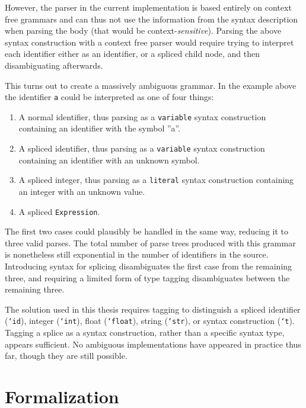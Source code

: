 \documentclass{kththesis}
\begin{document}
However, the parser in the current implementation is based entirely on context free grammars and can thus not use the information from the syntax description when parsing the body (that would be context-\emph{sensitive}). Parsing the above syntax construction with a context free parser would require trying to interpret each identifier either as an identifier, or a spliced child node, and then disambiguating afterwards.

This turns out to create a massively ambiguous grammar. In the example above the identifier \texttt{a} could be interpreted as one of four things:
\begin{enumerate}
  \item A normal identifier, thus parsing as a \texttt{variable} syntax construction containing an identifier with the symbol ''a''.
  \item A spliced identifier, thus parsing as a \texttt{variable} syntax construction containing an identifier with an unknown symbol.
  \item A spliced integer, thus parsing as a \texttt{literal} syntax construction containing an integer with an unknown value.
  \item A spliced \texttt{Expression}.
\end{enumerate}

The first two cases could plausibly be handled in the same way, reducing it to three valid parses. The total number of parse trees produced with this grammar is nonetheless still exponential in the number of identifiers in the source. Introducing syntax for splicing disambiguates the first case from the remaining three, and requiring a limited form of type tagging disambiguates between the remaining three.

The solution used in this thesis requires tagging to distinguish a spliced identifier (\texttt{`id}), integer (\texttt{`int}), float (\texttt{`float}), string (\texttt{`str}), or syntax construction (\texttt{`t}). Tagging a splice as a syntax construction, rather than a specific syntax type, appears sufficient. No ambiguous implementations have appeared in practice thus far, though they are still possible.

\chapter{Formalization} \label{sec:formalization}
\end{document}
